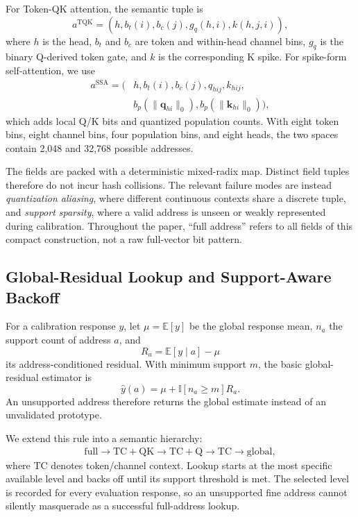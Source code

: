For Token-QK attention, the semantic tuple is
\begin{equation}
 a^{\mathrm{TQK}}=(h,b_t(i),b_c(j),g_q(h,i),k(h,j,i)),
\end{equation}
where $h$ is the head, $b_t$ and $b_c$ are token and within-head channel bins,
$g_q$ is the binary Q-derived token gate, and $k$ is the corresponding K
spike. For spike-form self-attention, we use
\begin{equation}
\begin{aligned}
 a^{\mathrm{SSA}}=(&h,b_t(i),b_c(j),q_{hij},k_{hij},\\
 &b_p(\lVert\mathbf q_{hi}\rVert_0),
 b_p(\lVert\mathbf k_{hi}\rVert_0)),
\end{aligned}
\end{equation}
which adds local Q/K bits and quantized population counts. With eight token
bins, eight channel bins, four population bins, and eight heads, the two
spaces contain 2,048 and 32,768 possible addresses.

The fields are packed with a deterministic mixed-radix map. Distinct field
tuples therefore do not incur hash collisions. The relevant failure modes are
instead \emph{quantization aliasing}, where different continuous contexts
share a discrete tuple, and \emph{support sparsity}, where a valid address is
unseen or weakly represented during calibration. Throughout the paper,
``full address'' refers to all fields of this compact construction, not a raw
full-vector bit pattern.

\subsection{Global-Residual Lookup and Support-Aware Backoff}
\label{sec:global_residual_backoff}

For a calibration response $y$, let $\mu=\mathbb{E}[y]$ be the global response
mean, $n_a$ the support count of address $a$, and
\begin{equation}
  R_a=\mathbb{E}[y\mid a]-\mu
\end{equation}
its address-conditioned residual. With minimum support $m$, the basic
global-residual estimator is
\begin{equation}
  \hat y(a)=\mu+\mathbb{I}[n_a\geq m]R_a.
  \label{eq:global_residual}
\end{equation}
An unsupported address therefore returns the global estimate instead of an
unvalidated prototype.

We extend this rule into a semantic hierarchy:
\begin{equation}
\begin{aligned}
 \mathrm{full}
 \rightarrow \mathrm{TC+QK}
 \rightarrow \mathrm{TC+Q}
 \rightarrow \mathrm{TC}
 \rightarrow \mathrm{global},
\end{aligned}
\label{eq:backoff_chain}
\end{equation}
where TC denotes token/channel context. Lookup starts at the most specific
available level and backs off until its support threshold is met. The selected
level is recorded for every evaluation response, so an unsupported fine
address cannot silently masquerade as a successful full-address lookup.

